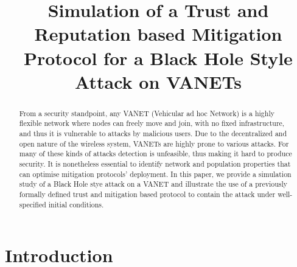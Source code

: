 \documentclass[compsoc, conference, letterpaper, 10pt, times]{IEEEtran}
\begin{document}
\title{Simulation of a Trust and Reputation based Mitigation Protocol for a Black Hole Style Attack on VANETs}


\author{

\and

\and
{}
    }


\maketitle

\begin{abstract}
From a security standpoint, any VANET (Vehicular ad hoc Network) is a highly flexible network where nodes can freely move and join, with no fixed infrastructure, and thus it is vulnerable to attacks by malicious users. Due to the decentralized and open nature of the wireless system, VANETs are highly prone to various attacks. For many of these kinds of attacks detection is unfeasible, thus making it hard to produce security. It is nonetheless essential to identify network and population properties that can optimise mitigation protocols' deployment. In this paper, we provide a simulation study of a Black Hole stye attack on a VANET and illustrate the use of a previously formally defined trust and mitigation based protocol to contain the attack under well-specified initial conditions.
\end{abstract}


\section{Introduction}\label{sec:intro}
\end{document}
